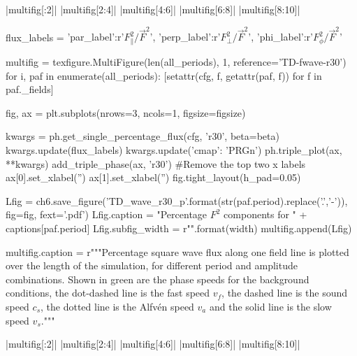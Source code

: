 \py[chapter6]|multifig[:2]|
\py[chapter6]|multifig[2:4]|
\py[chapter6]|multifig[4:6]|
\py[chapter6]|multifig[6:8]|
\py[chapter6]|multifig[8:10]|


\begin{pycode}[chapter6]
flux_labels = {'par_label':r'$F_\parallel^2 / \vec{F}^2$', 
               'perp_label':r'$F_\perp^2 / \vec{F}^2$',
               'phi_label':r'$F_\phi^2 / \vec{F}^2$'}

multifig = texfigure.MultiFigure(len(all_periods), 1, reference='TD-fwave-r30')
for i, paf in enumerate(all_periods):
    [setattr(cfg, f, getattr(paf, f)) for f in paf._fields]
    
    fig, ax = plt.subplots(nrows=3, ncols=1, figsize=figsize)
    
    kwargs = ph.get_single_percentage_flux(cfg, 'r30', beta=beta)
    kwargs.update(flux_labels)
    kwargs.update({'cmap': 'PRGn'})
    ph.triple_plot(ax, **kwargs)
    add_triple_phase(ax, 'r30')
    #Remove the top two x labels
    ax[0].set_xlabel('')
    ax[1].set_xlabel('')
    fig.tight_layout(h_pad=0.05)
    
    Lfig = ch6.save_figure('TD_wave_r30_p{}'.format(str(paf.period).replace('.','-')), fig=fig, fext='.pdf')
    Lfig.caption = "Percentage $F^2$ components for " + captions[paf.period]
    Lfig.subfig_width = r"{}\columnwidth".format(width)
    multifig.append(Lfig)

multifig.caption = r"""Percentage square wave flux along one field line is plotted over the length of the simulation, for different period and amplitude combinations. Shown in green are the phase speeds for the background conditions, the dot-dashed line is the fast speed $v_f$, the dashed line is the sound speed $c_s$, the dotted line is the Alfv\'en speed $v_a$ and the solid line is the slow speed $v_s$."""

\end{pycode}


\py[chapter6]|multifig[:2]|
\py[chapter6]|multifig[2:4]|
\py[chapter6]|multifig[4:6]|
\py[chapter6]|multifig[6:8]|
\py[chapter6]|multifig[8:10]|


